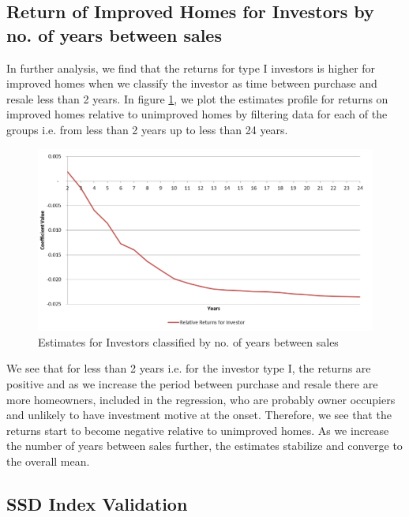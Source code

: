 \documentclass{article}
\begin{document}
\clearpage
\subsection{Return of Improved Homes for Investors by no. of years between sales}

In further analysis, we find that the returns for type I investors is higher for improved homes when we classify the investor as time between purchase and resale less than 2 years. In figure \ref{fig:relative_returns_by_investor}, we plot the estimates profile for returns on improved homes relative to unimproved homes by filtering data for each of the groups i.e. from less than 2 years up to less than 24 years. 

\begin{figure}[!ht]
    \centering
     \includegraphics[width=0.9\columnwidth]{Figures/relative_returns_by_investor.png} \par
 \caption{Estimates for Investors classified by no. of years between sales}
 \label{fig:relative_returns_by_investor}
\end{figure}


We see that for less than 2 years i.e. for the investor type I, the returns are positive and as we increase the period between purchase and resale there are more homeowners, included in the regression, who are probably owner occupiers and unlikely to have investment motive at the onset. Therefore, we see that the returns start to become negative relative to unimproved homes. As we increase the number of years between sales further, the estimates stabilize and converge to the overall mean. 



\subsection{SSD Index Validation}
\end{document}
